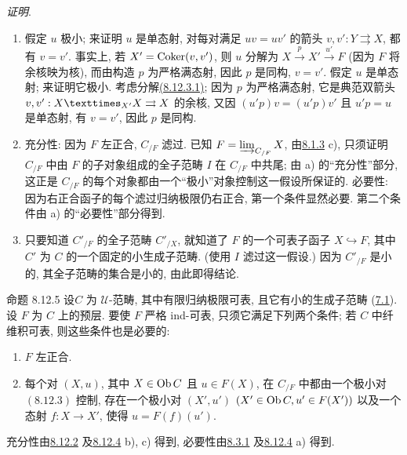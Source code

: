 \noindent \emph{证明}.\pageoriginale
\begin{enumerate}
\renewcommand{\theenumi}{\alph{enumi}}
\renewcommand{\labelenumi}{\theenumi)}
\item 假定 $u$ 极小; 来证明 $u$ 是单态射,
\ie 对每对满足 $uv=uv'$ 的箭头 $v,v':Y\rightrightarrows X$, 都有 $v=v'$.
事实上, 若 $X'=\operatorname{Coker}(v,v')$, 则 $u$ 分解为
$X\xrightarrow{p}X'\xrightarrow{u'}F$ (因为 $F$ 将余核映为核),
而由构造 $p$ 为严格满态射, 因此 $p$ 是同构, \ie $v=v'$.
假定 $u$ 是单态射; 来证明它极小.
考虑分解\hyperlink{sga4.exp.I.equation.8.12.3.1}{(8.12.3.1)};
因为 $p$ 为严格满态射, 它是典范双箭头
$v,v':\fprod{X}{X}{X'}\rightrightarrows X$ 的余核,
又因 $(u'p)v=(u'p)v'$ 且 $u'p=u$ 是单态射,
有 $v=v'$, 因此 $p$ 是同构.

\item 充分性: 因为 $F$ 左正合, $C_{/F}$ 滤过.
已知 $F=\varinjlim_{C_{/F}}X$, 由\hyperref[I.prop8.1.3]{8.1.3} c),
只须证明 $C_{/F}$ 中由 $F$ 的子对象组成的全子范畴 $I$ 在 $C_{/F}$ 中共尾;
由 a) 的“充分性”部分, 这正是 $C_{/F}$ 的每个对象都由一个“极小”对象控制这一假设所保证的.
必要性: 因为右正合函子的每个滤过归纳极限仍右正合, 第一个条件显然必要.
第二个条件由 a) 的“必要性”部分得到.

\item 只要知道 $C'_{/F}$ 的全子范畴 $C'_{/X}$,
就知道了 $F$ 的一个可表子函子 $X\hookrightarrow F$,
其中 $C'$ 为 $C$ 的一个固定的小生成子范畴.
(使用 $I$ 滤过这一假设.)
因为 $C'_{/F}$ 是小的, 其全子范畴的集合是小的, 由此即得结论.
\end{enumerate}

\begin{enonce*}{命题 8.12.5}
设\pageoriginale $C$ 为 $𝒰$-范畴, 其中有限归纳极限可表,
且它有小的生成子范畴 (\hyperref[I.def7.1]{7.1}).
设 $F$ 为 $C$ 上的预层.
要使 $F$ 严格 ind-可表, 只须它满足下列两个条件;
若 $C$ 中纤维积可表, 则这些条件也是必要的:
\begin{enumerate}
\renewcommand{\theenumi}{\alph{enumi}}
\renewcommand{\labelenumi}{\theenumi)}
\item $F$ 左正合.

\item 每个对 $(X,u)$, 其中 $X\in \operatorname{Ob} C$ 且 $u\in F(X)$,
在 $C_{/F}$ 中都由一个极小对 $\hyperref[I.sec8.12.3]{(8.12.3)}$ 控制,
\ie 存在一个极小对 $(X',u')$ $(X'\in \operatorname{Ob} C, u'\in F(X'))$
以及一个态射 $f:X\rightarrow X'$, 使得 $u=F(f)(u')$.
\end{enumerate}
\end{enonce*}

充分性由\hyperref[I.prop8.12.2]{8.12.2} 及\hyperref[I.lem8.12.4]{8.12.4} b), c) 得到,
必要性由\hyperref[I.prop8.3.1]{8.3.1} 及\hyperref[I.lem8.12.4]{8.12.4} a) 得到.

